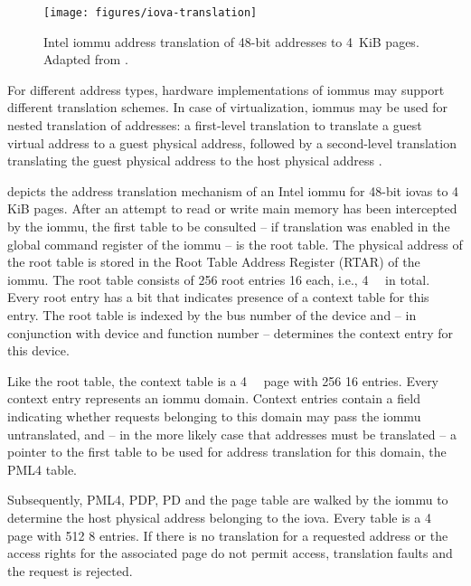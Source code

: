 \begin{figure}[!b]
    \centering
    \texttt{[image: figures/iova-translation]}
    \caption{Intel \acs{iommu} address translation of 48-bit addresses to 4~KiB
    pages. Adapted from \cite{morgan2018iommu}.}
    \label{fig:translation}
\end{figure}

For different address types, hardware implementations of \acp{iommu} may support
different translation schemes. In case of virtualization, \acp{iommu} may be
used for nested translation of addresses: a first-level translation to translate
a guest virtual address to a guest physical address, followed by a second-level
translation translating the guest physical address to the host physical address
\cite[pp.~43~ff.]{intel2019iommu}.

 depicts the address translation mechanism of an Intel
\ac{iommu} for 48-bit \acp{iova} to 4 KiB pages. After an attempt to read or
write main memory has been intercepted by the \ac{iommu}, the first table to be
consulted -- if translation was enabled in the global command register of the
\ac{iommu} -- is the root table. The physical address of the root table is
stored in the Root Table Address Register (RTAR) of the \ac{iommu}. The root
table consists of 256 root entries \SI{16}{\byte} each, i.e., \SI{4}{\kibi\byte}
in total. Every root entry has a bit that indicates presence of a context table
for this entry. The root table is indexed by the bus number of the device and --
in conjunction with device and function number -- determines the context entry
for this device.

Like the root table, the context table is a \SI{4}{\kibi\byte} page with 256
\SI{16}{\byte} entries. Every context entry represents an \ac{iommu} domain.
Context entries contain a field indicating whether requests belonging to this
domain may pass the \ac{iommu} untranslated, and -- in the more likely case that
addresses must be translated -- a pointer to the first table to be used for
address translation for this domain, the PML4 table.

Subsequently, PML4, PDP, PD and the page table are walked by the \ac{iommu} to
determine the host physical address belonging to the \ac{iova}. Every table is a
\SI{4}{\kibi\byte} page with 512 \SI{8}{\byte} entries. If there is no
translation for a requested address or the access rights for the associated page
do not permit access, translation faults and the request is rejected.

